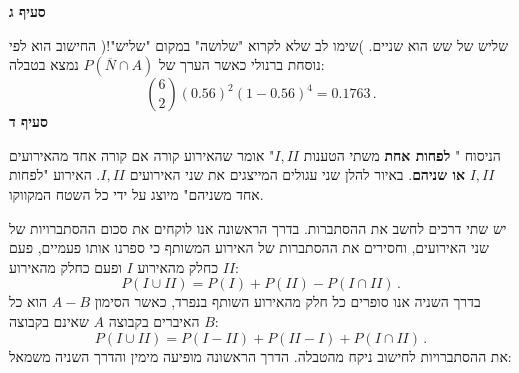\textbf{סעיף ג}

שליש של שש הוא שניים. )שימו לב שלא לקרוא "שלושה" במקום "שליש"!( החישוב הוא לפי נוסחת ברנולי כאשר הערך של
$P(\overline{N}\cap A)$
נמצא בטבלה:
\[
{6 \choose 2}(0.56)^2 (1-0.56)^4=0.1763\,.
\]
\textbf{סעיף ד}

הניסוח "%
\textbf{לפחות אחת}
משתי הטענות
$I, II$"
אומר שהאירוע קורה אם קורה אחד מהאירועים
$I, II$
\textbf{או שניהם}.
באיור להלן שני עגולים המייצגים את שני האירועים
$I, II$.
האירוע "לפחות אחד משניהם" מיוצג על ידי כל השטח המקווקו.
\begin{center}
\end{center}
יש שתי דרכים לחשב את ההסתברות. בדרך הראשונה אנו לוקחים את סכום ההסתברויות של שני האירועים, וחסירים את ההסתברות של האירוע המשותף כי ספרנו אותו פעמיים, פעם כחלק מהאירוע 
$I$
ופעם כחלק מהאירוע
$II$:
\[
P(I \cup II) = P(I) + P(II) - P(I \cap II)\,.
\]
בדרך השניה אנו סופרים כל חלק מהאירוע השותף בנפרד, כאשר הסימון
$A-B$
הוא כל האיברים בקבוצה 
$A$
שאינם בקבוצה
$B$:
\[
P(I \cup II) = P(I-II) + P(II-I) + P(I \cap II)\,.
\]
את ההסתברויות לחישוב ניקח מהטבלה. הדרך הראשונה מופיעה מימין והדרך השניה משמאל:
